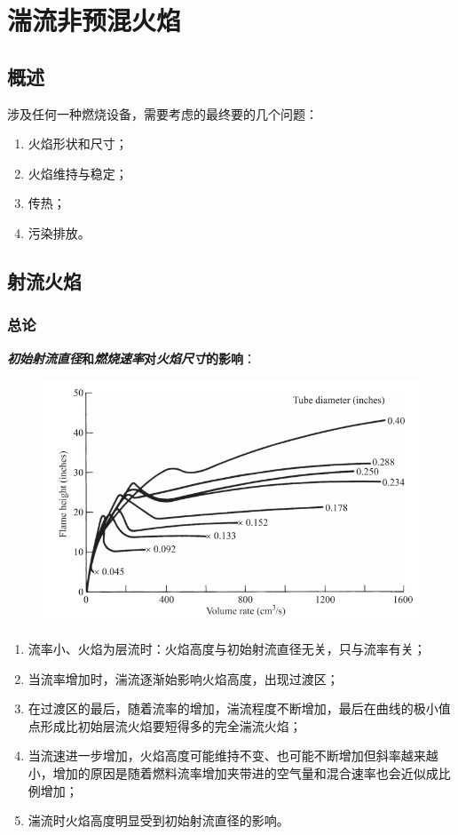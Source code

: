 \section{湍流非预混火焰}
\subsection{概述}
涉及任何一种燃烧设备，需要考虑的最终要的几个问题：

\begin{enumerate}
    \item 火焰形状和尺寸；
    \item 火焰维持与稳定；
    \item 传热；
    \item 污染排放。
\end{enumerate}

\subsection{射流火焰}
\subsubsection{总论}

\textbf{\textit{初始射流直径}和\textit{燃烧速率}对\textit{火焰尺寸}的影响}：

\begin{figure}[H]
    \includegraphics[width=.3\textwidth]{img/q_v_vs_h.png}
\end{figure}

\begin{enumerate}
    \item 流率小、火焰为层流时：火焰高度与初始射流直径无关，只与流率有关；
    \item 当流率增加时，湍流逐渐始影响火焰高度，出现过渡区；
    \item 在过渡区的最后，随着流率的增加，湍流程度不断增加，最后在曲线的极小值点形成比初始层流火焰要短得多的完全湍流火焰；
    \item 当流速进一步增加，火焰高度可能维持不变、也可能不断增加但斜率越来越小，增加的原因是随着燃料流率增加夹带进的空气量和混合速率也会近似成比例增加；
    \item 湍流时火焰高度明显受到初始射流直径的影响。
\end{enumerate}

